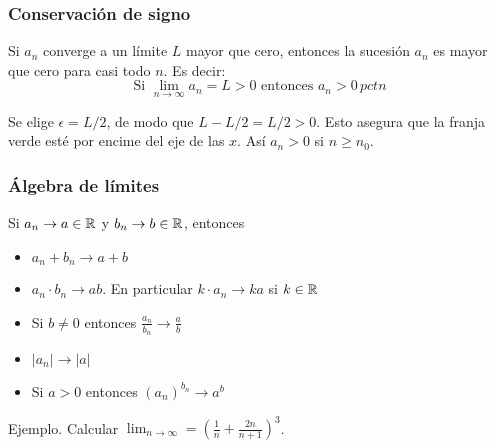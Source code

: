 \documentclass[../Teoría.root.tex]{subfiles}
\begin{document}
\subsubsection{Conservación de signo}
Si \(a_n\) converge a un límite \(L\) mayor que cero, entonces la sucesión \(a_n\) es mayor que cero para casi todo \(n\).
Es decir:
\[\text{Si }\lim_{n\to\infty}a_n=L>0\text{ entonces }a_n>0\,pctn\]
\begin{center}
    \begin{scaletikzpicturetowidth}{.5\linewidth}
    \end{scaletikzpicturetowidth}
\end{center}
Se elige \(\epsilon=L/2\), de modo que \(L-L/2=L/2>0\).
Esto asegura que la franja verde esté por encime del eje de las \(x\).
Así \(a_n>0\) si \(n\geq n_0\).
\subsubsection{Álgebra de límites}
Si \(a_n\rightarrow a\in\mathbb{R}\) y \(b_n\rightarrow b\in\mathbb{R}\), entonces
\begin{itemize}
    \item \(a_n+b_n\rightarrow a+b\)
    \item \(a_n\cdot b_n\rightarrow ab\).
          En particular \(k\cdot a_n\rightarrow ka\) si \(k\in\mathbb{R}\)
    \item Si \(b\neq0\) entonces \(\frac{a_n}{b_n}\rightarrow\frac{a}{b}\)
    \item \(|a_n|\rightarrow|a|\)
    \item Si \(a>0\) entonces \((a_n)^{b_n}\rightarrow a^b\)
\end{itemize}
Ejemplo.
Calcular \(\lim_{n\to\infty}=\left(\frac{1}{n}+\frac{2n}{n+1}\right)^3\).
\end{document}
